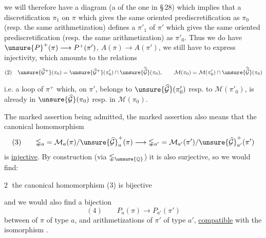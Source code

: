 we will therefore have a diagram (a  of the one in \S\,28)
which  implies that a discretification $\pi_1$ on $\pi$ which gives the same oriented prediscretification as $\pi_0$ (resp. the same arithmetization) defines a  $\pi'_1$ of $\pi'$ which gives the same oriented prediscretification (resp. the same arithmetization) as $\pi'_0$. Thus we do have $\unsure{P}^{+}(\pi)\longrightarrow P^+(\pi')$, $A(\pi)\longrightarrow A(\pi')$, we still have to express injectivity, which amounts to the relations
\[
\begin{gathered}
(2)\quad
\unsure{\widehat{\mathcal G}^{+}}(\pi_0)
=
\unsure{\widehat{\mathcal G}^{+}}(\pi'_0)\cap
\unsure{\widehat{\widehat{\mathcal G}}}(\pi_0),\qquad
\mathcal M(\pi_0)=\mathcal M(\pi'_0)\cap
\unsure{\widehat{\widehat{\mathcal G}}}(\pi_0)
\end{gathered}
\]

i.e. a loop  of $\pi^{+}$ which, on $\pi'$, belongs to $\unsure{\widehat{\mathcal G}}(\pi'_0)$  resp. to $\mathcal M(\pi'_0)$, is already in $\unsure{\widehat{\mathcal G}}(\pi_0)$ resp. in $\mathcal M(\pi_0)$.

The  marked assertion being admitted, the marked assertion also means that the canonical homomorphism
\[
(3)\qquad
\mathbb{\Gamma}_a=\mathcal M_a(\pi)/\unsure{\widehat{\mathcal G}}^{+}_a(\pi)
\longrightarrow
\mathbb{\Gamma}_{a'}=\mathcal M_{a'}(\pi')/\unsure{\widehat{\mathcal G}}^{+}_{a'}(\pi')
\]
is \uline{injective}. By construction (via $\mathbb{\Gamma}_{\unsure{\mathbb Q}}$) it is also surjective, so we would find:

\textcircled{2} the canonical homomorphism (3) is bijective

and we would also find a bijection
\[
(4)\qquad P_a(\pi)\longrightarrow P_{a'}(\pi')
\]
between  of $\pi$ of type $a$, and arithmetizations of $\pi'$ of type $a'$, \uline{compatible} with the isomorphism .

